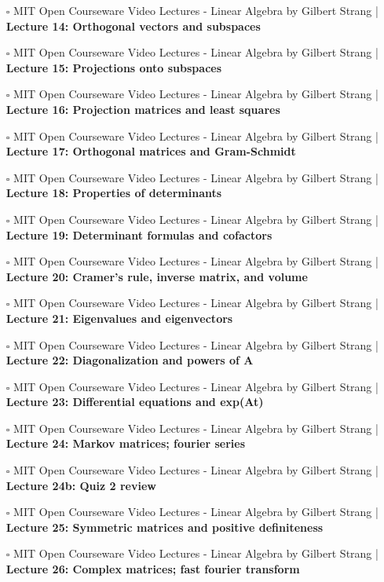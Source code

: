 \documentclass[a4, landscape, 12pt]{article}
\newcommand{\checkbox}{$\square$}%
\begin{document}
\begin{itemize}
{}
\item [\checkbox] MIT Open Courseware Video Lectures - Linear Algebra by Gilbert Strang  | \textbf{Lecture 14: Orthogonal vectors and subspaces
}
\item [\checkbox] MIT Open Courseware Video Lectures - Linear Algebra by Gilbert Strang  | \textbf{Lecture 15: Projections onto subspaces
}
\item [\checkbox] MIT Open Courseware Video Lectures - Linear Algebra by Gilbert Strang  | \textbf{Lecture 16: Projection matrices and least squares
}
\item [\checkbox] MIT Open Courseware Video Lectures - Linear Algebra by Gilbert Strang  | \textbf{Lecture 17: Orthogonal matrices and Gram-Schmidt
}
\item [\checkbox] MIT Open Courseware Video Lectures - Linear Algebra by Gilbert Strang  | \textbf{Lecture 18: Properties of determinants
}
\item [\checkbox] MIT Open Courseware Video Lectures - Linear Algebra by Gilbert Strang  | \textbf{Lecture 19: Determinant formulas and cofactors
}
\item [\checkbox] MIT Open Courseware Video Lectures - Linear Algebra by Gilbert Strang  | \textbf{Lecture 20: Cramer's rule, inverse matrix, and volume
}
\item [\checkbox] MIT Open Courseware Video Lectures - Linear Algebra by Gilbert Strang  | \textbf{Lecture 21: Eigenvalues and eigenvectors
}
\item [\checkbox] MIT Open Courseware Video Lectures - Linear Algebra by Gilbert Strang  | \textbf{Lecture 22: Diagonalization and powers of A
}
\item [\checkbox] MIT Open Courseware Video Lectures - Linear Algebra by Gilbert Strang  | \textbf{Lecture 23: Differential equations and exp(At)
}
\item [\checkbox] MIT Open Courseware Video Lectures - Linear Algebra by Gilbert Strang  | \textbf{Lecture 24: Markov matrices; fourier series
}
\item [\checkbox] MIT Open Courseware Video Lectures - Linear Algebra by Gilbert Strang  | \textbf{Lecture 24b: Quiz 2 review
}
\item [\checkbox] MIT Open Courseware Video Lectures - Linear Algebra by Gilbert Strang  | \textbf{Lecture 25: Symmetric matrices and positive definiteness
}
\item [\checkbox] MIT Open Courseware Video Lectures - Linear Algebra by Gilbert Strang  | \textbf{Lecture 26: Complex matrices; fast fourier transform
}
\end{itemize}
\end{document}

